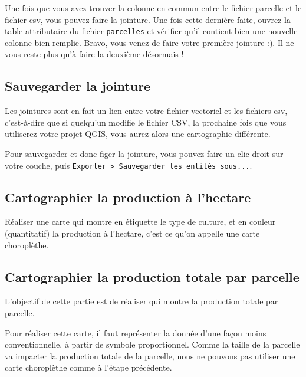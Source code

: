 Une fois que vous avez trouver la colonne en commun entre le fichier
parcelle et le fichier csv, vous pouvez faire la jointure. Une fois
cette dernière faite, ouvrez la table attributaire du fichier
\texttt{parcelles} et vérifier qu'il contient bien une nouvelle colonne
bien remplie. Bravo, vous venez de faire votre première jointure :). Il
ne vous reste plus qu'à faire la deuxième désormais !

\hypertarget{sauvegarder-la-jointure}{%
\subsection{Sauvegarder la jointure}\label{sauvegarder-la-jointure}}

Les jointures sont en fait un lien entre votre fichier vectoriel et les
fichiers csv, c'est-à-dire que si quelqu'un modifie le fichier CSV, la
prochaine fois que vous utiliserez votre projet QGIS, vous aurez alors
une cartographie différente.

Pour sauvegarder et donc figer la jointure, vous pouvez faire un clic
droit sur votre couche, puis
\texttt{Exporter\ \textgreater{}\ Sauvegarder\ les\ entités\ sous...}.

\hypertarget{cartographier-la-production-uxe0-lhectare}{%
\subsection{Cartographier la production à
l'hectare}\label{cartographier-la-production-uxe0-lhectare}}

Réaliser une carte qui montre en étiquette le type de culture, et en
couleur (quantitatif) la production à l'hectare, c'est ce qu'on appelle
une carte choroplèthe.

\hypertarget{cartographier-la-production-totale-par-parcelle}{%
\subsection{Cartographier la production totale par
parcelle}\label{cartographier-la-production-totale-par-parcelle}}

L'objectif de cette partie est de réaliser qui montre la production
totale par parcelle.

Pour réaliser cette carte, il faut représenter la donnée d'une façon
moins conventionnelle, à partir de symbole proportionnel. Comme la
taille de la parcelle va impacter la production totale de la parcelle,
nous ne pouvons pas utiliser une carte choroplèthe comme à l'étape
précédente.

